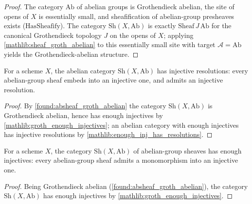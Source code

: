 \begin{proof}
  \leanok
  The category \(\mathrm{Ab}\) of abelian groups is Grothendieck abelian, the
  site of opens of \(X\) is essentially small, and sheafification of
  abelian-group presheaves exists (\(\mathrm{HasSheafify}\)).  The category
  \(\mathrm{Sh}(X,\mathrm{Ab})\) is exactly \(\mathrm{Sheaf}\,J\,\mathrm{Ab}\) for
  the canonical Grothendieck topology \(J\) on the opens of \(X\); applying
  \cref{mathlib:sheaf_groth_abelian} to this essentially small site with target
  \(\mathcal A=\mathrm{Ab}\) yields the Grothendieck-abelian structure.
\end{proof}

\begin{lemma}
  \label{found:absheaf_has_injective_resolutions}
  For a scheme \(X\), the abelian category \(\mathrm{Sh}(X,\mathrm{Ab})\) has
  injective resolutions: every abelian-group sheaf embeds into an injective one,
  and admits an injective resolution.
\end{lemma}

\begin{proof}
  \leanok
  By \cref{found:absheaf_groth_abelian} the category \(\mathrm{Sh}(X,\mathrm{Ab})\)
  is Grothendieck abelian, hence has enough injectives by
  \cref{mathlib:groth_enough_injectives}; an abelian category with enough
  injectives has injective resolutions by
  \cref{mathlib:enough_inj_has_resolutions}.
\end{proof}

\begin{lemma}
  \label{found:absheaf_enough_injectives}
  For a scheme \(X\), the category \(\mathrm{Sh}(X,\mathrm{Ab})\) of
  abelian-group sheaves has enough injectives: every abelian-group sheaf admits a
  monomorphism into an injective one.
\end{lemma}

\begin{proof}
  \leanok
  Being Grothendieck abelian (\cref{found:absheaf_groth_abelian}), the category
  \(\mathrm{Sh}(X,\mathrm{Ab})\) has enough injectives by
  \cref{mathlib:groth_enough_injectives}.
\end{proof}

